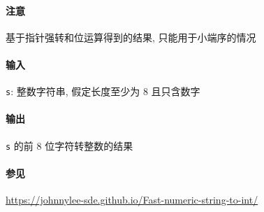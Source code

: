 \paragraph{注意}

基于指针强转和位运算得到的结果, 只能用于小端序的情况

\paragraph{输入}

\verb|s|: 整数字符串, 假定长度至少为 8 且只含数字

\paragraph{输出}

\verb|s| 的前 8 位字符转整数的结果

\paragraph{参见}

\url{https://johnnylee-sde.github.io/Fast-numeric-string-to-int/}
